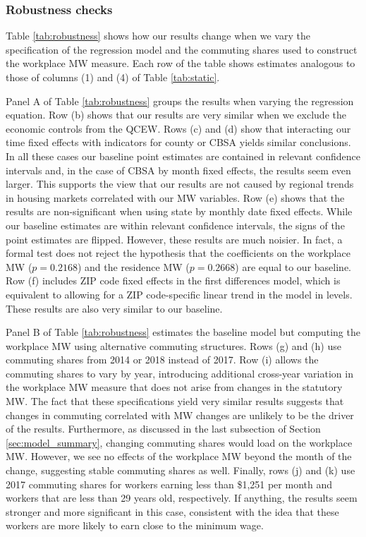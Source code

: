\subsubsection{Robustness checks}

Table \ref{tab:robustness} shows how our results change when we vary the
specification of the regression model and the commuting shares used 
to construct the workplace MW measure.
Each row of the table shows estimates analogous to those of columns (1) and (4)
of Table \ref{tab:static}.

Panel A of Table \ref{tab:robustness} groups the results when varying the 
regression equation.
Row (b) shows that our results are very similar when we exclude the 
economic controls from the QCEW.
Rows (c) and (d) show that interacting our time fixed effects with indicators 
for county or CBSA yields similar conclusions.
In all these cases our baseline point estimates are contained in relevant 
confidence intervals and, in the case of CBSA by month fixed effects, 
the results seem even larger.
This supports the view that our results are not caused by regional trends 
in housing markets correlated with our MW variables.
Row (e) shows that the results are non-significant when using state by 
monthly date fixed effects.
While our baseline estimates are within relevant confidence intervals, the 
signs of the point estimates are flipped.
However, these results are much noisier.
In fact, a formal test does not reject the hypothesis that the coefficients
on the workplace MW ($p=0.2168$) and the residence MW ($p=0.2668$) are 
equal to our baseline.
Row (f) includes ZIP code fixed effects in the first differences model, which
is equivalent to allowing for a ZIP code-specific linear trend in the model in 
levels.
These results are also very similar to our baseline.

Panel B of Table \ref{tab:robustness} estimates the baseline model but 
computing the workplace MW using alternative commuting structures.
Rows (g) and (h) use commuting shares from 2014 or 2018 instead of 2017.
Row (i) allows the commuting shares to vary by year, introducing additional
cross-year variation in the workplace MW measure that does not arise from 
changes in the statutory MW.
The fact that these specifications yield very similar results suggests that 
changes in commuting correlated with MW changes are unlikely to be the driver
of the results.
Furthermore, as discussed in the last subsection of Section \ref{sec:model_summary},
changing commuting shares would load on the workplace MW.
However, we see no effects of the workplace MW beyond the month of the 
change, suggesting stable commuting shares as well.
Finally, rows (j) and (k) use 2017 commuting shares for workers earning 
less than \$1,251 per month and workers that are less than 29 years old, 
respectively.
If anything, the results seem stronger and more significant in this case, 
consistent with the idea that these workers are more likely to earn close to the 
minimum wage.

